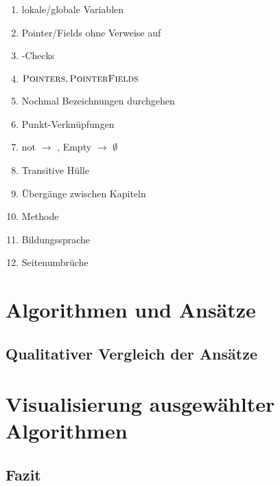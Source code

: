 
\listfiles


\listoftodos

\begin{enumerate}
	\item lokale/globale Variablen
	\item Pointer/Fields ohne Verweise auf \Roots
	\item {}-Checks
	\item $\textsc{Pointers}, \textsc{PointerFields}$
	\item Nochmal Bezeichnungen durchgehen
	\item Punkt-Verknüpfungen
	\item not $\rightarrow$ \NOT, Empty $\rightarrow$ $\emptyset$
	\item Transitive Hülle
	\item Übergänge zwischen Kapiteln
	\item Methode
	\item Bildungssprache
	\item Seitenumbrüche
\end{enumerate}



\cleardoublepage

\setcounter{page}{1}
\pagestyle{maincontentstyle}


\part{Algorithmen und Ansätze}




\chapter{Qualitativer Vergleich der Ansätze}		%

\part{Visualisierung ausgewählter Algorithmen}

\cleardoublepage

\chapter{Fazit}




